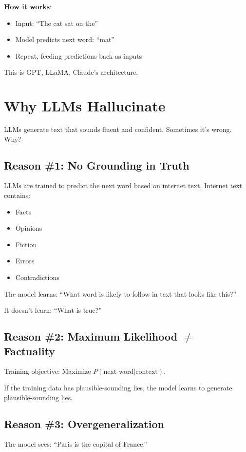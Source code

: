 \documentclass[11pt,oneside]{book}
\begin{document}
\textbf{How it works}:
\begin{itemize}
\item Input: ``The cat sat on the''
\item Model predicts next word: ``mat''
\item Repeat, feeding predictions back as inputs
\end{itemize}

This is GPT, LLaMA, Claude's architecture.

\section{Why LLMs Hallucinate}

LLMs generate text that sounds fluent and confident. Sometimes it's wrong. Why?

\subsection{Reason \#1: No Grounding in Truth}

LLMs are trained to predict the next word based on internet text. Internet text contains:
\begin{itemize}
\item Facts
\item Opinions
\item Fiction
\item Errors
\item Contradictions
\end{itemize}

The model learns: ``What word is likely to follow in text that looks like this?''

It doesn't learn: ``What is true?''

\subsection{Reason \#2: Maximum Likelihood $\neq$ Factuality}

Training objective: Maximize $P(\text{next word} | \text{context})$.

If the training data has plausible-sounding lies, the model learns to generate plausible-sounding lies.

\subsection{Reason \#3: Overgeneralization}

The model sees: ``Paris is the capital of France.''
\end{document}
